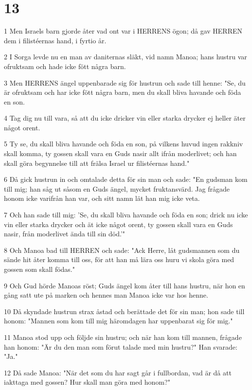 \chapter{13}

\par 1 Men Israels barn gjorde åter vad ont var i HERRENS ögon; då gav HERREN dem i filistéernas hand, i fyrtio år.
\par 2 I Sorga levde nu en man av daniternas släkt, vid namn Manoa; hans hustru var ofruktsam och hade icke fött några barn.
\par 3 Men HERRENS ängel uppenbarade sig för hustrun och sade till henne: "Se, du är ofruktsam och har icke fött några barn, men du skall bliva havande och föda en son.
\par 4 Tag dig nu till vara, så att du icke dricker vin eller starka drycker ej heller äter något orent.
\par 5 Ty se, du skall bliva havande och föda en son, på vilkens huvud ingen rakkniv skall komma, ty gossen skall vara en Guds nasir allt ifrån moderlivet; och han skall göra begynnelse till att frälsa Israel ur filistéernas hand."
\par 6 Då gick hustrun in och omtalade detta för sin man och sade: "En gudsman kom till mig; han såg ut såsom en Guds ängel, mycket fruktansvärd. Jag frågade honom icke varifrån han var, och sitt namn lät han mig icke veta.
\par 7 Och han sade till mig: 'Se, du skall bliva havande och föda en son; drick nu icke vin eller starka drycker och ät icke något orent, ty gossen skall vara en Guds nasir, från moderlivet ända till sin död.'"
\par 8 Och Manoa bad till HERREN och sade: "Ack Herre, låt gudsmannen som du sände hit åter komma till oss, för att han må lära oss huru vi skola göra med gossen som skall födas."
\par 9 Och Gud hörde Manoas röst; Guds ängel kom åter till hans hustru, när hon en gång satt ute på marken och hennes man Manoa icke var hos henne.
\par 10 Då skyndade hustrun strax åstad och berättade det för sin man; hon sade till honom: "Mannen som kom till mig häromdagen har uppenbarat sig för mig."
\par 11 Manoa stod upp och följde sin hustru; och när han kom till mannen, frågade han honom: "Är du den man som förut talade med min hustru?" Han svarade: "Ja."
\par 12 Då sade Manoa: "När det som du har sagt går i fullbordan, vad är då att iakttaga med gossen? Hur skall man göra med honom?"
